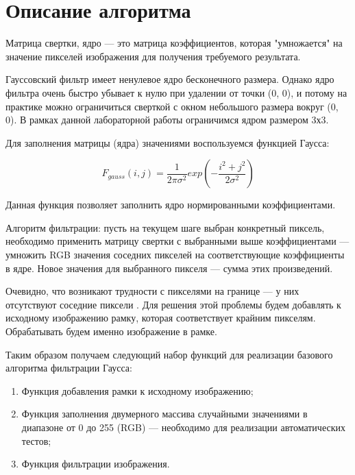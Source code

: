 \documentclass{report}
\begin{document}
	\newpage


	\section*{Описание алгоритма}
	
	\par Матрица свертки, ядро — это матрица коэффициентов, которая "умножается" на значение пикселей изображения для получения требуемого результата.
	\par Гауссовский фильтр имеет ненулевое ядро бесконечного размера. Однако ядро фильтра очень быстро убывает к нулю при удалении от точки (0, 0), и потому на практике можно ограничиться сверткой с окном небольшого размера вокруг (0, 0). В рамках данной лабораторной работы ограничимся ядром размером 3х3.
	\par Для заполнения матрицы (ядра) значениями воспользуемся функцией Гаусса:

	\begin{equation}
		F_{gauss}(i, j) = \frac{1}{2\pi\sigma^{2}}exp\left(-\frac{i^{2}+j^{2}}{2\sigma^{2}}\right)
	\end{equation}

	\par Данная функция позволяет заполнить ядро нормированными коэффициентами.
	\par Алгоритм фильтрации: пусть на текущем шаге выбран конкретный пиксель, необходимо применить матрицу свертки с выбранными выше коэффициентами — умножить RGB значения соседних пикселей на соответствующие коэффициенты в ядре. Новое значения для выбранного пикселя — сумма этих произведений.
	\par Очевидно, что возникают трудности с пикселями на границе — у них отсутствуют соседние пиксели . Для решения этой проблемы будем добавлять к исходному изображению рамку, которая соответствует крайним пикселям. Обрабатывать будем именно изображение в рамке.
	\par Таким образом получаем следующий набор функций для реализации базового алгоритма фильтрации Гаусса:

	\begin{enumerate}
		\item Функция добавления рамки к исходному изображению;
		\item Функция заполнения двумерного массива случайными значениями в диапазоне от 0 до 255 (RGB) — необходимо для реализации автоматических тестов;
		\item Функция фильтрации изображения.
	\end{enumerate}
\end{document}
